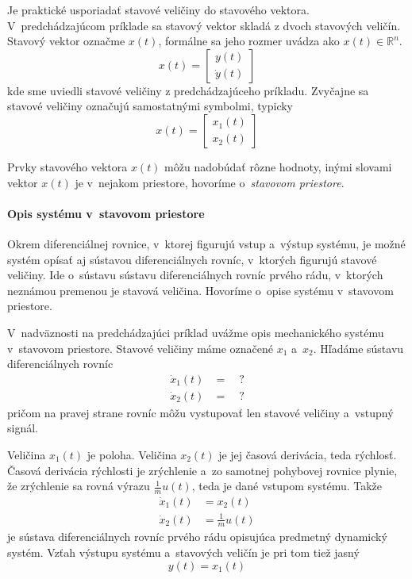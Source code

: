 \documentclass[a4paper, 10pt, ]{article}
\begin{document}
Je praktické usporiadať stavové veličiny do stavového vektora. V~predchádzajúcom príklade sa stavový vektor skladá z dvoch stavových veličín. Stavový vektor označme $x(t)$, formálne sa jeho rozmer uvádza ako $x(t) \in \mathbb R^n$.
\begin{equation}
    x(t) = 
    \begin{bmatrix}
        y(t) \\ \dot y(t)
    \end{bmatrix}
\end{equation}
kde sme uviedli stavové veličiny z predchádzajúceho príkladu. Zvyčajne sa stavové veličiny označujú samostatnými symbolmi, typicky
\begin{equation}
    x(t) = 
    \begin{bmatrix}
        x_1(t) \\ x_2(t)
    \end{bmatrix}
\end{equation}

Prvky stavového vektora $x(t)$ môžu nadobúdať rôzne hodnoty, inými slovami vektor $x(t)$ je v~nejakom priestore, hovoríme o~\emph{stavovom priestore}.


\paragraph{Opis systému v~stavovom priestore}

Okrem diferenciálnej rovnice, v~ktorej figurujú vstup a~výstup systému, je možné systém opísať aj sústavou diferenciálnych rovníc, v~ktorých  figurujú stavové veličiny. Ide o~sústavu sústavu diferenciálnych rovníc prvého rádu, v~ktorých neznámou premenou je stavová veličina. Hovoríme o~opise systému v~stavovom priestore.

V~nadväznosti na predchádzajúci príklad uvážme opis mechanického systému v~stavovom priestore. Stavové veličiny máme označené $x_1$ a~$x_2$. Hľadáme sústavu diferenciálnych rovníc
\begin{align*}
    \dot x_1(t) &= \quad ? \\
    \dot x_2(t) &= \quad ? 
\end{align*}
pričom na pravej strane rovníc môžu vystupovať len stavové veličiny a~vstupný signál.

Veličina $x_1(t)$ je poloha. Veličina $x_2(t)$ je jej časová derivácia, teda rýchlosť. Časová derivácia rýchlosti je zrýchlenie a~zo samotnej pohybovej rovnice plynie, že zrýchlenie sa rovná výrazu $\frac{1}{m} u(t)$, teda je dané vstupom systému. Takže
\begin{subequations}
    \begin{align}
        \dot x_1(t) &= x_2(t) \\
        \dot x_2(t) &= \frac{1}{m} u(t)
    \end{align}    
\end{subequations}
je sústava diferenciálnych rovníc prvého rádu opisujúca predmetný dynamický systém. Vzťah výstupu systému a~stavových veličín je pri tom tiež jasný
\begin{equation}
    y(t) = x_1(t)
\end{equation}
\end{document}
